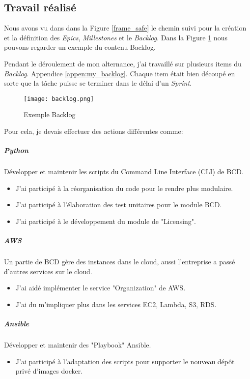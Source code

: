 \subsection{Travail réalisé}
Nous avons vu dans dans la Figure \ref{frame_safe} le chemin suivi pour la création et la définition des \textit{Epics}, \textit{Millestones} et le \textit{Backlog}. Dans la Figure \ref{fig:backlog} nous pouvons regarder un exemple du contenu Backlog.

Pendant le déroulement de mon alternance, j'ai travaillé sur plusieurs items du \textit{Backlog}. Appendice  \ref{appen:my_backlog}. Chaque item était bien découpé en sorte que la tâche puisse se terminer dans le délai d'un \textit{Sprint}.

\begin{figure}[!ht]
\centering
\texttt{[image: backlog.png]}
\caption{Exemple Backlog}
\label{fig:backlog}
\end{figure}

Pour cela, je devais effectuer des actions différentes comme:

\subparagraph{Python} Développer et maintenir les scripts du Command Line Interface (CLI) de BCD.
\begin{itemize}
  \item J'ai participé à la réorganisation du code pour le rendre plus modulaire.
  \item J'ai participé à l'élaboration des test unitaires pour le module BCD.
  \item J'ai participé à le développement du module de "Licensing".
\end{itemize}

\subparagraph{AWS} Un partie de BCD gère des instances dans le cloud, aussi l'entreprise a passé d'autres services sur le cloud.
\begin{itemize}
  \item J'ai aidé implémenter le service "Organization" de AWS.
  \item J'ai du m'impliquer plus dans les services EC2, Lambda, S3, RDS.
\end{itemize}

\subparagraph{Ansible} Développer et maintenir des "Playbook" Ansible.
\begin{itemize}
  \item J'ai participé à l'adaptation des scripts pour supporter le nouveau dépôt privé d'images docker.
\end{itemize}

